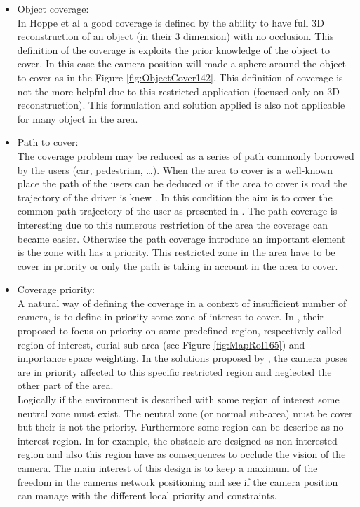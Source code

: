 \begin{itemize}
\item Object coverage: \\
   In Hoppe et al \cite{142*hoppe2012}  a good coverage is defined by  the ability to have full 3D reconstruction of an  object (in  their  3 dimension)  with no occlusion. This definition of the coverage is exploits the prior knowledge of the object to cover.  In this case the camera position will made a sphere around the object to cover as in the Figure \ref{fig:ObjectCover142}. 
   This definition of coverage  is not the more helpful due to this restricted application (focused only on 3D reconstruction). This formulation and solution applied is also not applicable for many object in the area. \\
   \item Path to cover: \\
   The coverage problem may be reduced as a series of path commonly borrowed by the users (car,  pedestrian, …). When the area to cover is a well-known place the path of the users can be deduced \cite{27*bodor2005} or if the area to cover is road the trajectory of the driver is knew \cite{14*lu2011}.  In this condition the aim is to cover the common path trajectory of the user as presented in  \cite{14*lu2011,27*bodor2005,30*bodor2005,81*nikolaidis2009}. The path coverage is interesting due to this numerous restriction of the area the coverage can became easier. Otherwise the path coverage introduce an important element is the zone with has a priority. This restricted zone in the area have to be cover in priority or only the path is taking in account in the area to cover.\\
   \item Coverage priority: \\
   A natural way of defining the coverage in a context of insufficient number of camera, is to define in priority some zone of interest to cover.
    In \cite{84*xu2011,165*jiang2010,171*horster2006} , their proposed to focus on priority on some predefined region, respectively called  region of interest, curial  sub-area (see Figure \ref{fig:MapRoI165}) and importance space weighting.  In the solutions proposed  by \cite{84*xu2011,165*jiang2010,171*horster2006}, the camera poses are in priority affected to this specific restricted region and neglected the other part of the area. \\
Logically if the environment is described with some region of interest some neutral zone must exist. The neutral zone (or normal sub-area) must be cover but their is not the priority. Furthermore some region can be describe as no interest region. In \cite{165*jiang2010,171*horster2006}  for example, the obstacle are designed as non-interested region and also this region have as consequences to occlude the vision of the camera. The main interest of this design is to keep a maximum of the  freedom in the cameras network positioning and see if the camera position can manage with the different local priority and constraints.\\

\end{itemize}
